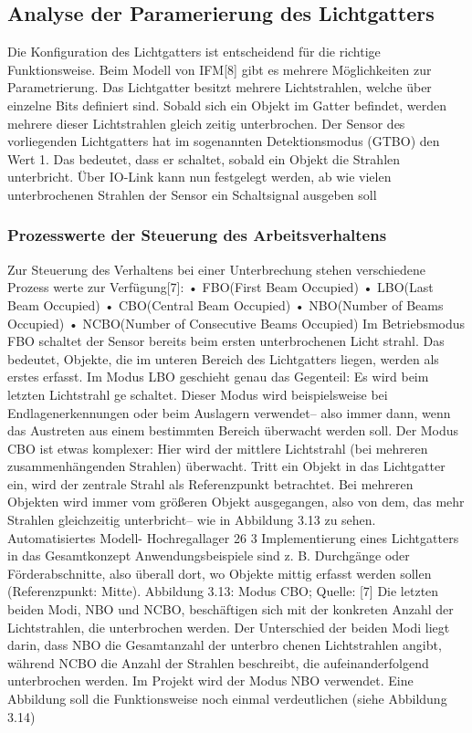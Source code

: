 \subsection{Analyse der Paramerierung des Lichtgatters}
Die Konfiguration des Lichtgatters ist entscheidend für die richtige Funktionsweise. Beim
Modell von IFM[8] gibt es mehrere Möglichkeiten zur Parametrierung.
Das Lichtgatter besitzt mehrere Lichtstrahlen, welche über einzelne Bits definiert sind.
Sobald sich ein Objekt im Gatter befindet, werden mehrere dieser Lichtstrahlen gleich
zeitig unterbrochen.
Der Sensor des vorliegenden Lichtgatters hat im sogenannten Detektionsmodus
(GTBO) den Wert 1. Das bedeutet, dass er schaltet, sobald ein Objekt die Strahlen
unterbricht.
Über IO-Link kann nun festgelegt werden, ab wie vielen unterbrochenen Strahlen der
Sensor ein Schaltsignal ausgeben soll

\subsubsection{Prozesswerte der Steuerung des Arbeitsverhaltens}
Zur Steuerung des Verhaltens bei einer Unterbrechung stehen verschiedene Prozess
werte zur Verfügung[7]:
• FBO(First Beam Occupied)
• LBO(Last Beam Occupied)
• CBO(Central Beam Occupied)
• NBO(Number of Beams Occupied)
• NCBO(Number of Consecutive Beams Occupied)
Im Betriebsmodus FBO schaltet der Sensor bereits beim ersten unterbrochenen Licht
strahl. Das bedeutet, Objekte, die im unteren Bereich des Lichtgatters liegen, werden
als erstes erfasst.
Im Modus LBO geschieht genau das Gegenteil: Es wird beim letzten Lichtstrahl ge
schaltet.
Dieser Modus wird beispielsweise bei Endlagenerkennungen oder beim Auslagern
verwendet– also immer dann, wenn das Austreten aus einem bestimmten Bereich
überwacht werden soll.
Der Modus CBO ist etwas komplexer: Hier wird der mittlere Lichtstrahl (bei mehreren
zusammenhängenden Strahlen) überwacht. Tritt ein Objekt in das Lichtgatter ein, wird
der zentrale Strahl als Referenzpunkt betrachtet. Bei mehreren Objekten wird immer
vom größeren Objekt ausgegangen, also von dem, das mehr Strahlen gleichzeitig
unterbricht– wie in Abbildung 3.13 zu sehen.
Automatisiertes Modell- Hochregallager
26
3 Implementierung eines Lichtgatters in das Gesamtkonzept
Anwendungsbeispiele sind z. B. Durchgänge oder Förderabschnitte, also überall dort,
wo Objekte mittig erfasst werden sollen (Referenzpunkt: Mitte).
Abbildung 3.13: Modus CBO; Quelle: [7]
Die letzten beiden Modi, NBO und NCBO, beschäftigen sich mit der konkreten Anzahl
der Lichtstrahlen, die unterbrochen werden.
Der Unterschied der beiden Modi liegt darin, dass NBO die Gesamtanzahl der unterbro
chenen Lichtstrahlen angibt, während NCBO die Anzahl der Strahlen beschreibt, die
aufeinanderfolgend unterbrochen werden.
Im Projekt wird der Modus NBO verwendet. Eine Abbildung soll die Funktionsweise
noch einmal verdeutlichen (siehe Abbildung 3.14)

